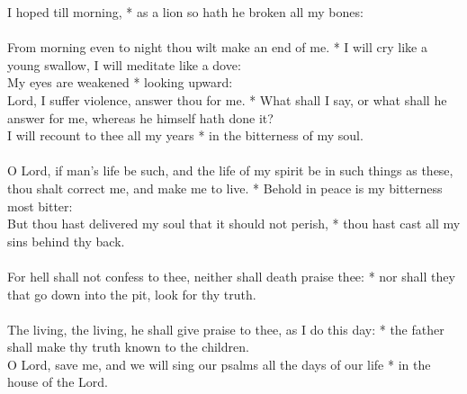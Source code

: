 \begin{Parallel}[v]{\colw}{\colx}
{{I hoped till morning, * as a lion so hath he broken all my bones:\\ \\
From morning even to night thou wilt make an end of me. * I will cry like a young swallow, I will meditate like a dove:\\
My eyes are weakened * looking upward:\\
Lord, I suffer violence, answer thou for me. * What shall I say, or what shall he answer for me, whereas he himself hath done it?\\
I will recount to thee all my years * in the bitterness of my soul.\\ \\
O Lord, if man’s life be such, and the life of my spirit be in such things as these, thou shalt correct me, and make me to live. * Behold in peace is my bitterness most bitter:\\
But thou hast delivered my soul that it should not perish, * thou hast cast all my sins behind thy back.\\ \\
For hell shall not confess to thee, neither shall death praise thee: * nor shall they that go down into the pit, look for thy truth.\\ \\
The living, the living, he shall give praise to thee, as I do this day: * the father shall make thy truth known to the children.\\
O Lord, save me, and we will sing our psalms all the days of our life * in the house of the Lord.}}

\end{Parallel}



